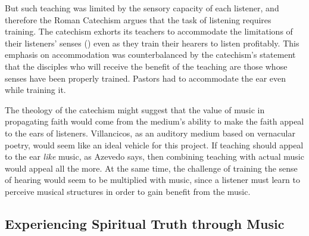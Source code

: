 But such teaching was limited by the sensory capacity of each listener, and therefore the Roman Catechism argues that the task of listening requires training.
The catechism exhorts its teachers to accommodate the limitations of their listeners' senses () even as they train their hearers to listen profitably.
This emphasis on accommodation was counterbalanced by the catechism's statement that the disciples who will receive the benefit of the teaching are those whose senses have been properly trained.
Pastors had to accommodate the ear even while training it.

The theology of the catechism might suggest that the value of music in propagating faith would come from the medium's ability to make the faith appeal to the ears of listeners.
Villancicos, as an auditory medium based on vernacular poetry, would seem like an ideal vehicle for this project.
If teaching should appeal to the ear \emph{like} music, as Azevedo says, then combining teaching with actual music would appeal all the more.
At the same time, the challenge of training the sense of hearing would seem to be multiplied with music, since a listener must learn to perceive musical structures in order to gain benefit from the music.

\subsection{Experiencing Spiritual Truth through Music}

